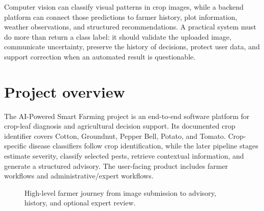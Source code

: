 \documentclass[12pt,a4paper,oneside,openany]{report}
\begin{document}
Computer vision can classify visual patterns in crop images, while a backend platform can connect those predictions to farmer history, plot information, weather observations, and structured recommendations. A practical system must do more than return a class label: it should validate the uploaded image, communicate uncertainty, preserve the history of decisions, protect user data, and support correction when an automated result is questionable.

\section{Project overview}
The AI-Powered Smart Farming project is an end-to-end software platform for crop-leaf diagnosis and agricultural decision support. Its documented crop identifier covers Cotton, Groundnut, Pepper Bell, Potato, and Tomato. Crop-specific disease classifiers follow crop identification, while the later pipeline stages estimate severity, classify selected pests, retrieve contextual information, and generate a structured advisory. The user-facing product includes farmer workflows and administrative/expert workflows.

\begin{figure}[htbp]
\centering
{}
\caption{High-level farmer journey from image submission to advisory, history, and optional expert review.}
\label{fig:farmer-journey}
\end{figure}
\end{document}
